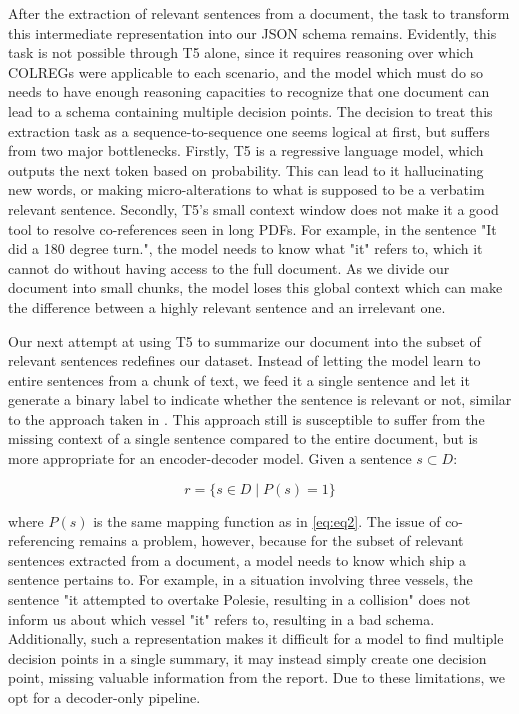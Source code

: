 \documentclass[10pt]{reportMaster}
\begin{document}
After the extraction of relevant sentences from a document, the task to transform this intermediate representation into our JSON schema remains. Evidently, this task is not possible through T5 alone, since it requires reasoning over which COLREGs were applicable to each scenario, and the model which must do so needs to have enough reasoning capacities to recognize that one document can lead to a schema containing multiple decision points. The decision to treat this extraction task as a sequence-to-sequence one seems logical at first, but suffers from two major bottlenecks. Firstly, T5 is a regressive language model, which outputs the next token based on probability. This can lead to it hallucinating new words, or making micro-alterations to what is supposed to be a verbatim relevant sentence. Secondly, T5's small context window does not make it a good tool to resolve co-references seen in long PDFs. For example, in the sentence "It did a 180 degree turn.", the model needs to know what "it" refers to, which it cannot do without having access to the full document. As we divide our document into small chunks, the model loses this global context which can make the difference between a highly relevant sentence and an irrelevant one.

Our next attempt at using T5 to summarize our document into the subset of relevant sentences redefines our dataset. Instead of letting the model learn to entire sentences from a chunk of text, we feed it a single sentence and let it generate a binary label to indicate whether the sentence is relevant or not, similar to the approach taken in \cite{nogueira2020documentrankingpretrainedsequencetosequence}. This approach still is susceptible to suffer from the missing context of a single sentence compared to the entire document, but is more appropriate for an encoder-decoder model. Given a sentence $s \subset D$:

\begin{equation}
    r = \{ s \in D \mid P(s) = 1 \}
\end{equation}

where $P(s)$ is the same mapping function as in \eqref{eq:eq2}. The issue of co-referencing remains a problem, however, because for the subset of relevant sentences extracted from a document, a model needs to know which ship a sentence pertains to. For example, in a situation involving three vessels, the sentence "it attempted to overtake Polesie, resulting in a collision" does not inform us about which vessel "it" refers to, resulting in a bad schema. Additionally, such a representation makes it difficult for a model to find multiple decision points in a single summary, it may instead simply create one decision point, missing valuable information from the report. Due to these limitations, we opt for a decoder-only pipeline.
\end{document}
